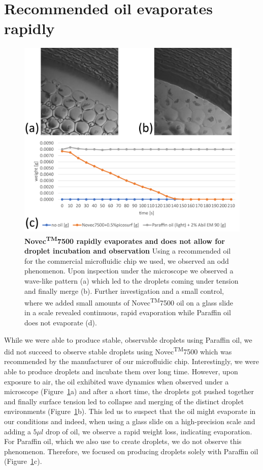 \section{Recommended oil evaporates rapidly}
\begin{figure}
\centering
\includegraphics[width=\linewidth]{graphics/2025_09_30_droplets_fig6.png}
\caption{\textbf{Novec\textsuperscript{TM}7500 rapidly evaporates and does not allow for droplet incubation and observation} Using a recommended oil for the commercial microfluidic chip we used, we observed an odd phenomenon. Upon inspection under the microscope we observed a wave-like pattern (a) which led to the droplets coming under tension and finally merge (b). Further investigation and a small control, where we added small amounts of Novec\textsuperscript{TM}7500 oil on a glass slide in a scale revealed continuous, rapid evaporation while Paraffin oil does not evaporate (d).}
\label{fig:results_oil_evaporation}
\end{figure}
While we were able to produce stable, observable droplets using Paraffin oil, we did not succeed to observe stable droplets using Novec\textsuperscript{TM}7500 which was recommended by the manufacturer of our microfluidic chip. Interestingly, we were able to produce droplets and incubate them over long time. However, upon exposure to air, the oil exhibited wave dynamics when observed under a microscope (Figure~\ref{fig:results_oil_evaporation}a) and after a short time, the droplets got pushed together and finally surface tension led to collapse and merging of the distinct droplet environments (Figure~\ref{fig:results_oil_evaporation}b). This led us to suspect that the oil might evaporate in our conditions and indeed, when using a glass slide on a high-precision scale and adding a $5 \mu l$ drop of oil, we observe a rapid weight loss, indicating evaporation. For Paraffin oil, which we also use to create droplets, we do not observe this phenomenon. Therefore, we focused on producing droplets solely with Paraffin oil (Figure~\ref{fig:results_oil_evaporation}c).

